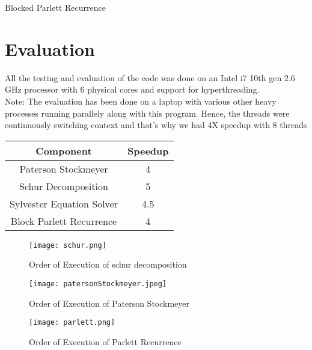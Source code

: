 \documentclass[12pt,a4paper]{article}
\begin{document}
\begin{algorithm}
\caption{Blocked Parlett Recurrence}\label{euclid}
\begin{algorithmic}[1]
    \EndFor
\EndFor
\end{algorithmic}
\end{algorithm}

\newpage
\section{Evaluation}
All the testing and evaluation of the code was done on an Intel i7 10th gen 2.6 GHz processor with 6 physical cores and support for hyperthreading. \\
Note: The evaluation has been done on a laptop with various other heavy processes running parallely along with this program. Hence, the threads were continuously switching context and that's why we had 4X speedup with 8 threads 


\begin{center}
\begin{tabular}{||c c||} 
 \hline
 Component & Speedup \\ [0.5ex] 
 \hline\hline
 Paterson Stockmeyer & 4 \\ 
 \hline
 Schur Decomposition & 5\\
 \hline
 Sylvester Equation Solver & 4.5 \\
 \hline
 Block Parlett Recurrence & 4\\
 \hline
\end{tabular}
\end{center}

\begin{figure}[h]
    \centering
    \texttt{[image: schur.png]}
    \caption{Order of Execution of schur decomposition}
\end{figure}
\begin{figure}[h]
    \centering
    \texttt{[image: patersonStockmeyer.jpeg]}
    \caption{Order of Execution of Paterson Stockmeyer}
\end{figure}


\begin{figure}[!htb]
    \centering
    \texttt{[image: parlett.png]}
    \caption{Order of Execution of Parlett Recurrence}
\end{figure}
\end{document}

